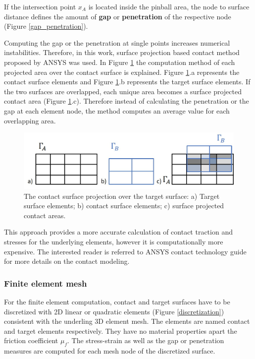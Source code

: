 If the intersection point $x_A$ is located inside the pinball area, the node to surface distance defines the amount of \textbf{gap} or \textbf{penetration} of the respective node (Figure \ref{gap_penetration}).
 
Computing the gap or the penetration at single points increases numerical instabilities.  Therefore, in this work, surface projection based contact method proposed by ANSYS was used. In Figure \ref{fig:projecte_surface} the computation method of each projected area over the contact surface is explained. Figure \ref{fig:projecte_surface}.a represents the contact surface elements and Figure \ref{fig:projecte_surface}.b represents the target surface elements.  If the two surfaces are overlapped, each unique area becomes a surface projected contact area (Figure \ref{fig:projecte_surface}.c). Therefore instead of calculating  the penetration or the gap at each element node, the method computes an average value for each overlapping area.


\begin{figure}[!h]
\centering
\includegraphics[width=1\textwidth,keepaspectratio]{figures/projecte_surface.jpg} 
\caption{The contact surface projection over the target surface: a) Target surface elements; b) contact surface elements; c) surface projected contact areas.}
\label{fig:projecte_surface}
\end{figure}

This approach provides a more accurate calculation of contact traction and stresses for the underlying elements, however it is computationally more expensive. The interested reader is referred to ANSYS contact technology guide \citep{ansys_contact_2017} for more details on the contact modeling.


\subsubsection*{Finite element mesh}
For the finite element computation, contact and target surfaces have to be discretized with 2D linear or quadratic elements (Figure \ref{discretization}) consistent with the underling 3D element mesh. The elements are named contact and target elements respectively.  They have no material properties apart the friction coefficient $\mu_f$. The stress-strain as well as the gap or penetration measures are computed for each mesh node of the discretized surface.

